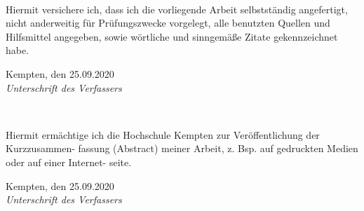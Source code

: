 \newpage
\thispagestyle{empty}


\\ 

\vspace*{2cm}

\noindent
Hiermit versichere ich, dass ich die vorliegende Arbeit selbstständig angefertigt, 
nicht anderweitig für Prüfungszwecke vorgelegt, alle benutzten
Quellen und Hilfsmittel angegeben, sowie wörtliche und sinngemäße Zitate gekennzeichnet habe.
\vspace{2cm}

\noindent
Kempten, den 25.09.2020
\hspace*{2cm}%
\dotfill\\
\hspace*{8.5cm}%
\textit{Unterschrift des Verfassers}

\vspace*{5cm}

\\ 

\vspace*{2cm}

\noindent
Hiermit ermächtige ich die Hochschule Kempten zur Veröffentlichung der Kurzzusammen-
fassung (Abstract) meiner Arbeit, z. Bsp. auf gedruckten Medien oder auf einer Internet-
seite.
\vspace{2cm}

\noindent
Kempten, den 25.09.2020
\hspace*{2cm}%
\dotfill\\
\hspace*{8.5cm}%
\textit{Unterschrift des Verfassers}
